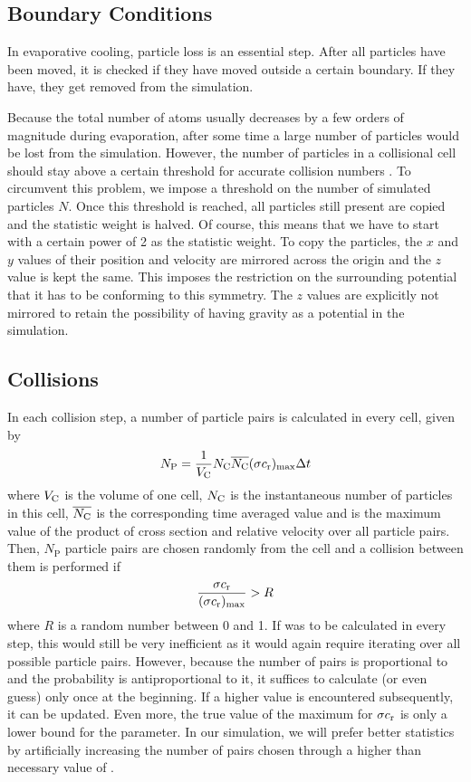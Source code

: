 \subsection{Boundary Conditions}
In evaporative cooling, particle loss is an essential step. After all particles have been moved, it is checked if they have moved outside a certain boundary. If they have, they get removed from the simulation. 

Because the total number of atoms usually decreases by a few orders of magnitude during evaporation, after some time a large number of particles would be lost from the simulation. However, the number of particles in a collisional cell should stay above a certain threshold for accurate collision numbers \cite{SUN20111}. To circumvent this problem, we impose a threshold on the number of simulated particles $N$. Once this threshold is reached, all particles still present are copied and the statistic weight is halved. Of course, this means that we have to start with a certain power of 2 as the statistic weight. To copy the particles, the $x$ and $y$ values of their position and velocity are mirrored across the origin and the $z$ value is kept the same. This imposes the restriction on the surrounding potential that it has to be conforming to this symmetry. The $z$ values are explicitly not mirrored to retain the possibility of having gravity as a potential in the simulation.

\subsection{Collisions}
\label{sec:eva_theory_collisions}
In each collision step, a number of particle pairs is calculated in every cell, given by
\begin{equation} \label{eq:ntc_npairs}
    N_\text{P} = \frac{1}{V_\text{C}} N_\text{C} \overline{N_\text{C}} (\sigma c_\text{r})_\text{max} \Delta t
\end{equation}
where $V_\text{C}$ is the volume of one cell, $N_\text{C}$ is the instantaneous number of particles in this cell, $\overline{N_\text{C}}$ is the corresponding time averaged value and \maxProb is the maximum value of the product of cross section and relative velocity over all particle pairs. 
Then, $N_\text{P}$ particle pairs are chosen randomly from the cell and a collision between them is performed if 
\begin{equation*} %
    \frac{\sigma \crel}{\maxProb} > R
\end{equation*} 
where $R$ is a random number between 0 and 1.
If \maxProb was to be calculated in every step, this would still be very inefficient as it would again require iterating over all possible particle pairs. However, because the number of pairs is proportional to \maxProb and the probability is antiproportional to it, it suffices to calculate (or even guess) \maxProb only once at the beginning. If a higher value is encountered subsequently, it can be updated. Even more, the true value of the maximum for $\sigma c_\text{r}$ is only a lower bound for the \maxProb parameter. In our simulation, we will prefer better statistics by artificially increasing the number of pairs chosen through a higher than necessary value of \maxProb.

